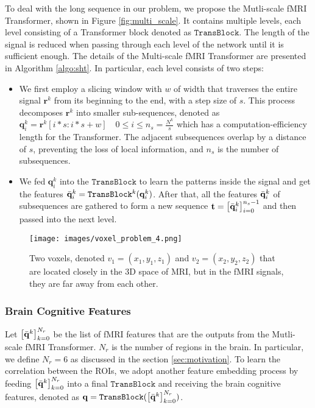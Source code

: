 To deal with the long sequence in our problem, we propose the Mutli-scale fMRI Transformer, shown in Figure \ref{fig:multi_scale}. It contains multiple levels, each level consisting of a Transformer block denoted as $\texttt{TransBlock}$. The length of the signal is reduced when passing through each level of the network until it is sufficient enough. 
The details of the Multi-scale fMRI Transformer are presented in Algorithm \ref{algo:sht}.
In particular, each level consists of  two steps:
\begin{itemize}
    \item We first employ a slicing window with $w$ of width that traverses the entire signal $\mathbf{r}^k$ from its beginning to the end, with a step size of $s$. This process decomposes $\mathbf{r}^k$ into smaller sub-sequences, denoted as $\mathbf{q}_i^k = \mathbf{r}^k\left[i * s:i * s+w\right] \quad 0 \leq i \leq n_s = \frac{N^k}{s}$ which has a computation-efficiency length for the Transformer. The adjacent subsequences overlap by a distance of $s$, preventing the loss of local information, and $n_s$ is the number of subsequences.

    \item We fed $\mathbf{q}_i^k$ into the $\texttt{TransBlock}$ to learn the patterns inside the signal and get the features $\Bar{\mathbf{q}}_{i}^k = \texttt{TransBlock}^k(\mathbf{q}_i^k)$. After that,  all the features $\Bar{\mathbf{q}}_{i}^k$ of subsequences are gathered to form a new sequence
    $\textbf{t} = \left[\Bar{\mathbf{q}}_{i}^k\right]_{i=0}^{n_s-1}$ and then passed into the next level. 
\end{itemize}

\begin{figure}[!t]
    \centering
    \texttt{[image: images/voxel\_problem\_4.png]}
    \vspace{-5mm}
    \caption{Two voxels, denoted $v_1 = (x_1, y_1, z_1)$ and $v_2 = (x_2, y_2, z_2)$ that are located closely in the 3D space of MRI, but in the fMRI signals, they are far away from each other.}
    \label{fig:voxel_problem}
    \vspace{-6mm}
\end{figure}

\subsubsection{Brain Cognitive Features}
\label{sec:brain_cognitive_features}
Let $\left[\Bar{\mathbf{q}}^k\right]_{k=0}^{N_r}$ be the list of fMRI features that are the outputs from the Mutli-scale fMRI Transformer. $N_r$ is the number of regions in the brain. In particular, we define $N_r = 6$ as discussed in the section \ref{sec:motivation}. 
To learn the correlation between the ROIs, we adopt another feature embedding process by feeding $\left[\Bar{\mathbf{q}}^k\right]_{k=0}^{N_r}$ into a final $\texttt{TransBlock}$ and receiving the brain cognitive features, denoted as $\mathbf{q} = \texttt{TransBlock}(\left[\Bar{\mathbf{q}}^k\right]_{k=0}^{N_r})$. 



